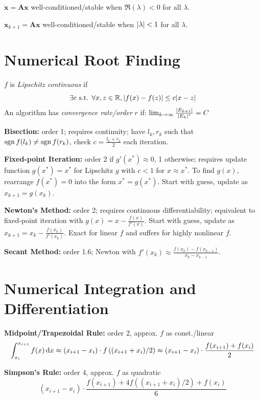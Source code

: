 \documentclass[twocolumn, 8pt]{extarticle}
\begin{document}
$\dot{\bm x} = \bm A\bm x$ well-conditioned/stable when $\Re(\lambda) < 0$ for all $\lambda$.

$\bm x_{k + 1} = \bm A\bm x$ well-conditioned/stable when $\lvert\lambda\rvert < 1$ for all $\lambda$.

\section{Numerical Root Finding} %

$f$ is \textit{Lipschitz continuous} if
$$\exists c\text{ s.t. }\forall x, z \in \mathbb{R}, \lvert f(x) - f(z)\rvert \leq c\lvert x - z\rvert$$
An algorithm has \textit{convergence rate/order} $r$ if:
$\lim _{k \to \infty} \frac{\lvert E_{k + 1}\rvert}{\lvert E_k\rvert^r} = C$

\textbf{Bisection:} order 1; requires continuity; have $l_k, r_k$ such that $\operatorname{sgn} f(l_k) \neq \operatorname{sgn} f(r_k)$, check $c = \frac{l_k + r_k}{2}$ each iteration.

\textbf{Fixed-point Iteration:} order 2 if $g'(x^*) \approx 0$, 1 otherwise; requires update function $g(x^*) = x^*$ for Lipschitz $g$ with $c < 1$ for $x \approx x^*$.
To find $g(x)$, rearrange $f(x^*) = 0$ into the form $x^* = g(x^*)$. Start with guess, update as $x_{k + 1} = g(x_k)$.

\textbf{Newton's Method:} order 2; requires continuous differentiability; equivalent to fixed-point iteration with $g(x) = x - \frac{f(x)}{f'(x)}$.
Start with guess, update as $x_{k + 1} = x_k - \frac{f(x_k)}{f'(x_k)}$. Exact for linear $f$ and suffers for highly nonlinear $f$.

\textbf{Secant Method:} order 1.6; Newton with $f'(x_k) \approx \frac{f(x_k) - f(x_{k - 1})}{x_k - x_{k - 1}}$.

\section{Numerical Integration and Differentiation} %

\textbf{Midpoint/Trapezoidal Rule:} order 2, approx. $f$ as const./linear
$$\int _{x_i}^{x_{i + 1}} f(x)\,\mathrm{d}x \approx (x_{i + 1} - x_i) \cdot f\left((x_{i + 1} + x_i)/2\right) \approx (x_{i + 1} - x_i) \cdot \frac{f(x_{i + 1}) + f(x_i)}{2}$$

\textbf{Simpson's Rule:} order 4, approx. $f$ as quadratic
$$(x_{i + 1} - x_i) \cdot \frac{f(x_{i + 1}) + 4f\left((x_{i + 1} + x_i)/2\right) + f(x_i)}{6}$$
\end{document}
